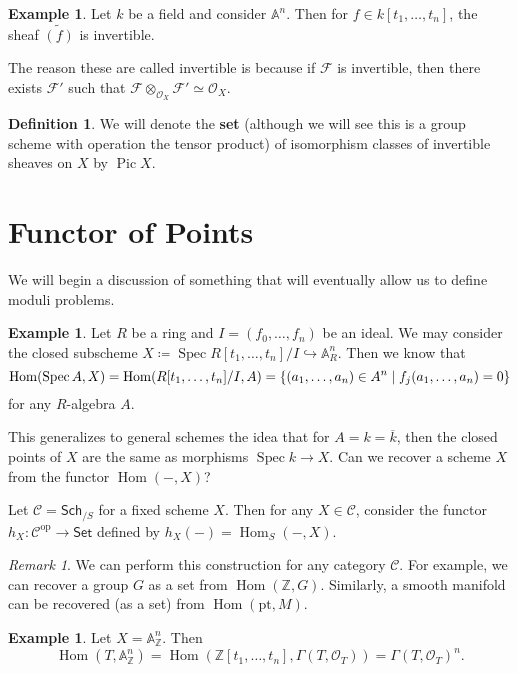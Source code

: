 \documentclass[leqno, openany]{memoir}
\theoremstyle{definition}
\newtheorem{defn}[thm]{Definition}
\newtheorem{exm}[thm]{Example}
\theoremstyle{remark}
\newtheorem{rmk}[thm]{Remark}
\theoremstyle{plain}
\theoremstyle{definition}
\theoremstyle{remark}
\newcommand{\A}{\mathbb{A}}
\newcommand{\Z}{\mathbb{Z}}
\newcommand{\mr}[1]{\mathrm{#1}}
\newcommand{\ms}[1]{\mathsf{#1}}
\newcommand{\msc}[1]{\mathscr{#1}}
\newcommand{\ol}[1]{\overline{#1}}
\newcommand{\wt}[1]{\widetilde{#1}}
\newcommand{\pt}{\mathrm{pt}}
\DeclareMathOperator{\Hom}{Hom}
\DeclareMathOperator{\Spec}{Spec}
\DeclareMathOperator{\Pic}{Pic}
\begin{document}
\begin{exm}
    Let $k$ be a field and consider $\A^n$. Then for $f \in k[t_1, \ldots, t_n]$, the sheaf $\wt{(f)}$ is invertible.
\end{exm}

The reason these are called invertible is because if $\msc{F}$ is invertible, then there exists $\msc{F}'$ such that $\msc{F} \otimes_{\msc{O}_X} \msc{F}' \simeq \msc{O}_X$.

\begin{defn}
    We will denote the \textbf{set} (although we will see this is a group scheme with operation the tensor product) of isomorphism classes of invertible sheaves on $X$ by $\Pic X$.
\end{defn}

\section{Functor of Points}%
\label{sec:functor_of_points}

We will begin a discussion of something that will eventually allow us to define moduli problems.

\begin{exm}
    Let $R$ be a ring and $I = (f_0, \ldots, f_n)$ be an ideal. We may consider the closed subscheme $X \coloneqq \Spec R[t_1, \ldots, t_n]/I \hookrightarrow \A^n_R$. Then we know that
    \[ \Hom(\Spec A, X) = \Hom(R[t_1, \ldots, t_n]/I, A) = \qty{(a_1, \ldots, a_n) \in A^n \mid f_j(a_1, \ldots, a_n) = 0} \]
    for any $R$-algebra $A$.
\end{exm}

This generalizes to general schemes the idea that for $A = k = \ol{k}$, then the closed points of $X$ are the same as morphisms $\Spec k \to X$. Can we recover a scheme $X$ from the functor $\Hom(-,X)$?

Let $\msc{C} = \ms{Sch}_{/S}$ for a fixed scheme $X$. Then for any $X \in \msc{C}$, consider the functor $h_X \colon \msc{C}^{\mr{op}} \to \ms{Set}$ defined by $h_X(-) = \Hom_S(-,X)$.

\begin{rmk}
    We can perform this construction for any category $\msc{C}$. For example, we can recover a group $G$ as a set from $\Hom(\Z, G)$. Similarly, a smooth manifold can be recovered (as a set) from $\Hom(\pt, M)$.
\end{rmk}

\begin{exm}
    Let $X = \A^n_{\Z}$. Then 
    \[ \Hom(T, \A^n_{\Z}) = \Hom(\Z[t_1, \ldots, t_n], \Gamma(T, \msc{O}_T)) = {\Gamma(T, \msc{O}_T)}^n. \]
\end{exm}
\end{document}
